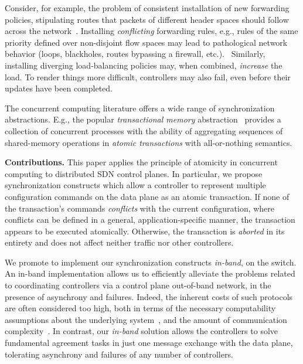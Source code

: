 \documentclass[conference]{sigcomm-alternate}
\begin{document}
Consider, for example, the problem of
consistent installation of new forwarding policies, stipulating routes
that packets of different header spaces should follow across the
network~\cite{network-update,roger-hotnets,podc15}.
Installing \emph{conflicting} forwarding rules, e.g., rules of the same priority defined over non-disjoint
flow spaces may lead to pathological network behavior (loops,
blackholes, routes bypassing a firewall, etc.).~\cite{hotnets14update,roger-hotnets}
Similarly, installing diverging load-balancing policies may,
when combined, \emph{increase} the load.
To render things more difficult, controllers may also fail,
even before their updates have been completed.

The concurrent computing literature offers
a wide range of synchronization abstractions.
E.g., the popular \emph{transactional
  memory} abstraction~\cite{tm-book} provides a collection of
concurrent processes with the ability of aggregating sequences of
shared-memory operations in \emph{atomic  transactions} with
all-or-nothing semantics.


\vspace{1mm}
\noindent\textbf{Contributions.}
This paper applies the principle of atomicity in concurrent computing
to distributed SDN control planes.
%
In particular, we propose synchronization constructs which
allow a controller to represent multiple configuration commands on
the data plane as an atomic transaction.
%
If none of the transaction's commands \emph{conflicts}  with the current
configuration, where conflicts can be
defined in a general, application-specific manner, the transaction appears to be executed atomically.
Otherwise, the transaction is \emph{aborted} in its entirety and does not
affect neither traffic nor other controllers.

We promote to implement our synchronization constructs \emph{in-band},
on the switch.
An in-band implementation allows us to efficiently alleviate the problems related to
coordinating controllers via a control plane
out-of-band network, in the presence of asynchrony and failures.
Indeed, the inherent costs  of such protocols are often considered too high, both in
terms of the necessary computability assumptions about the underlying
system~\cite{FLP85}, and the amount of communication
complexity~\cite{Lam06}.
In contrast, our \emph{in-band} solution allows the
controllers to solve fundamental agreement tasks in just one message
exchange with the data plane, tolerating asynchrony and failures of
any number of controllers. 
\end{document}
